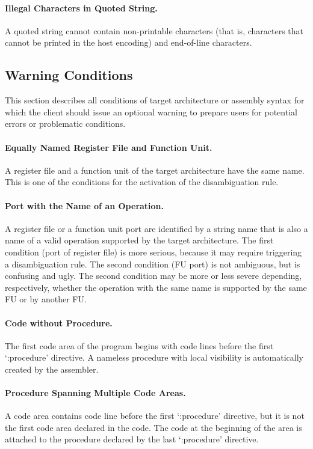 \documentclass[twoside]{tceusermanual}
\begin{document}
\paragraph{Illegal Characters in Quoted String.}
A quoted string cannot contain non-printable characters (that is, characters
that cannot be printed in the host encoding) and end-of-line characters.

\subsection{Warning Conditions}
\label{ssec:warnings}

This section describes all conditions of target architecture or assembly
syntax for which the client should issue an optional warning to prepare
users for potential errors or problematic conditions.

\paragraph{Equally Named Register File and Function Unit.}
A register file and a function unit of the target architecture have the same
name.  This is one of the conditions for the activation of the
disambiguation rule.

\paragraph{Port with the Name of an Operation.}
A register file or a function unit port are identified by a string name that
is also a name of a valid operation supported by the target architecture.
The first condition (port of register file) is more serious, because it may
require triggering a disambiguation rule.  The second condition (FU port) is
not ambiguous, but is confusing and ugly.  The second condition may be more
or less severe depending, respectively, whether the operation with the same
name is supported by the same FU or by another FU.

\paragraph{Code without Procedure.}
The first code area of the program begins with code lines before the first
`:procedure' directive. A nameless procedure with local visibility is
automatically created by the assembler.

\paragraph{Procedure Spanning Multiple Code Areas.}
A code area contains code line before the first `:procedure' directive, but
it is not the first code area declared in the code. The code at the
beginning of the area is attached to the procedure declared by the last
`:procedure' directive.
\end{document}
